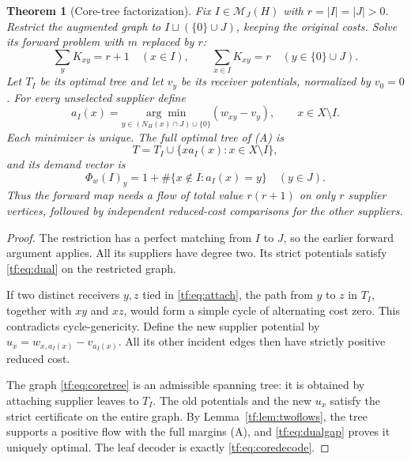 \documentclass[11pt]{article}
\numberwithin{equation}{section}
\newtheorem{theorem}{Theorem}[section]
\theoremstyle{definition}
\newcommand{\PM}{\mathcal M}
\begin{document}
\begin{theorem}[Core-tree factorization]
\label{tf:thm:core}
Fix $I\in\PM_J(H)$ with $r=|I|=|J|>0$. Restrict the augmented graph to
$I\sqcup(\{0\}\cup J)$, keeping the original costs. Solve its forward
problem with $m$ replaced by $r$:
\begin{equation}
 \sum_y K_{xy}=r+1\quad(x\in I),\qquad
 \sum_{x\in I}K_{xy}=r\quad(y\in\{0\}\cup J).
 \label{tf:eq:coreflow}
\end{equation}
Let $T_I$ be its optimal tree and let $v_y$ be its receiver potentials,
normalized by $v_0=0$. For every unselected supplier define
\begin{equation}
 a_I(x)=\underset{y\in (N_H(x)\cap J)\cup\{0\}}{\arg\min}
              (w_{xy}-v_y),\qquad x\in X\setminus I.
 \label{tf:eq:attach}
\end{equation}
Each minimizer is unique. The full optimal tree of (A) is
\begin{equation}
 T=T_I\cup\{x a_I(x):x\in X\setminus I\},
 \label{tf:eq:coretree}
\end{equation}
and its demand vector is
\begin{equation}
 \Phi_w(I)_y=1+\#\{x\notin I:a_I(x)=y\}\quad(y\in J).
 \label{tf:eq:coredecode}
\end{equation}
Thus the forward map needs a flow of total value $r(r+1)$ on only $r$
supplier vertices, followed by independent reduced-cost comparisons for
the other suppliers.
\end{theorem}
\begin{proof}
The restriction has a perfect matching from $I$ to $J$, so the earlier
forward argument applies. All its suppliers have degree two. Its strict
potentials satisfy \eqref{tf:eq:dual} on the restricted graph.

If two distinct receivers $y,z$ tied in \eqref{tf:eq:attach}, the path from
$y$ to $z$ in $T_I$, together with $xy$ and $xz$, would form a simple
cycle of alternating cost zero. This contradicts cycle-genericity.
Define the new supplier potential by
$u_x=w_{x,a_I(x)}-v_{a_I(x)}$. All its other incident edges then have
strictly positive reduced cost.

The graph \eqref{tf:eq:coretree} is an admissible spanning tree: it is
obtained by attaching supplier leaves to $T_I$. The old potentials and
the new $u_x$ satisfy the strict certificate on the entire graph. By
Lemma~\ref{tf:lem:twoflows}, the tree supports a positive flow with the full
margins (A), and \eqref{tf:eq:dualgap} proves it uniquely optimal. The leaf
decoder is exactly \eqref{tf:eq:coredecode}.
\end{proof}
\end{document}
